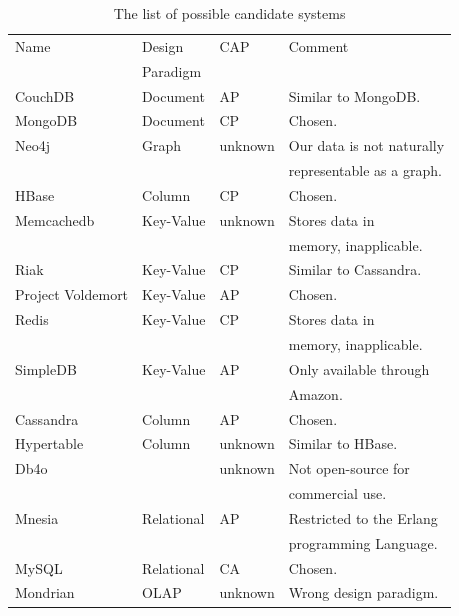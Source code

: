 \begin{table} [ht]
\caption{The list of possible candidate systems}
\centering
\begin{tabular}{l|l|l|l}
\hline\hline
Name		          &	Design          & CAP         & Comment                          \\
    		          &	Paradigm        &             &                                  \\
\hline
CouchDB           & Document        & AP          & Similar to MongoDB.              \\ 
MongoDB           & Document        & CP          & Chosen.                          \\
Neo4j             & Graph           & unknown     & Our data is not naturally        \\ 
                  &                 &             & representable as a graph.        \\
HBase             & Column          & CP          & Chosen.                          \\    
Memcachedb        & Key-Value       & unknown     & Stores data in                   \\ 
                  &                 &             & memory, inapplicable.            \\         
Riak              & Key-Value       & CP          & Similar to Cassandra.            \\
Project Voldemort & Key-Value       & AP          & Chosen.                          \\         
Redis             & Key-Value       & CP          & Stores data in                   \\ 
                  &                 &             & memory, inapplicable.            \\         
SimpleDB          & Key-Value       & AP          & Only available through           \\ 
                  &                 &             & Amazon.                          \\     
Cassandra         & Column          & AP          & Chosen.                          \\         
Hypertable        & Column          & unknown     & Similar to HBase.                \\     
Db4o              &                 & unknown     & Not open-source for              \\
                  &                 &             & commercial use.                  \\ 
Mnesia            & Relational      & AP          & Restricted to the Erlang         \\ 
                  &                 &             & programming Language.            \\        
MySQL             & Relational      & CA          & Chosen.                          \\
Mondrian          & OLAP            & unknown     & Wrong design paradigm.           \\
\hline
\end{tabular}
\label{table:allsystems}
\end{table}

